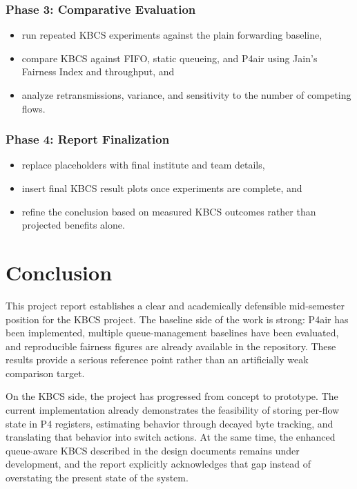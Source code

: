 \documentclass[12pt,a4paper]{report}
\begin{document}
\subsection{Phase 3: Comparative Evaluation}
\begin{itemize}
    \item run repeated KBCS experiments against the plain forwarding baseline,
    \item compare KBCS against FIFO, static queueing, and P4air using Jain's Fairness Index and throughput, and
    \item analyze retransmissions, variance, and sensitivity to the number of competing flows.
\end{itemize}

\subsection{Phase 4: Report Finalization}
\begin{itemize}
    \item replace placeholders with final institute and team details,
    \item insert final KBCS result plots once experiments are complete, and
    \item refine the conclusion based on measured KBCS outcomes rather than projected benefits alone.
\end{itemize}

\chapter{Conclusion}

This project report establishes a clear and academically defensible mid-semester position for the KBCS project. The baseline side of the work is strong: P4air has been implemented, multiple queue-management baselines have been evaluated, and reproducible fairness figures are already available in the repository. These results provide a serious reference point rather than an artificially weak comparison target.

On the KBCS side, the project has progressed from concept to prototype. The current implementation already demonstrates the feasibility of storing per-flow state in P4 registers, estimating behavior through decayed byte tracking, and translating that behavior into switch actions. At the same time, the enhanced queue-aware KBCS described in the design documents remains under development, and the report explicitly acknowledges that gap instead of overstating the present state of the system.
\end{document}

